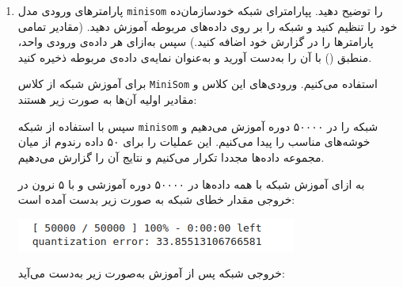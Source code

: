 \begin{enumerate}
\begin{qsolve}
	 	
	\end{qsolve}
	 	
	 	
	 	
	 	
	 	\item پارامتر‌های ورودی مدل \texttt{minisom} را توضیح دهید. پپارامترای شبکه خودسازمان‌ده خود را تنظیم کنید و شبکه را بر روی داده‌های مربوطه آموزش دهید. (مقادیر تمامی پارامتر‌ها را در گزارش خود اضافه کنید.) سپس به‌ازای هر داده‌ی ورودی واحد، منطبق () با آن را به‌دست آورید و به‌عنوان نمایه‌ی داده‌ی مربوطه ذخیره کنید.
	 	
	 	
	 \begin{qsolve}
	 	برای آموزش شبکه از کلاس \texttt{MiniSom} استفاده می‌کنیم. ورودی‌های این کلاس و مقادیر اولیه آن‌ها به صورت زیر هستند:
	 	
	 	
	 \end{qsolve}
	 	
	 	
	 	
	 	
	 	
	 	
	 	
	 	
	 	
	 \begin{qsolve}
	 	
	 	سپس با استفاده از شبکه \texttt{minisom} شبکه را در ۵۰۰۰۰ دوره آموزش می‌دهیم و خوشه‌های مناسب را پیدا می‌کنیم. این عملیات را برای ۵۰ داده رندوم از میان مجموعه داده‌ها مجددا تکرار می‌کنیم و نتایج آن را گزارش می‌دهیم.
	 	
	 	
	 	به ازای آموزش شبکه با همه داده‌ها در ۵۰۰۰۰ دوره آموزشی و با ۵ نرون در خروجی مقدار خطای شبکه به صورت زیر بدست آمده است:
	 	
	 	\begin{center}
	 		\includegraphics*[width=0.7\linewidth]{pics/img17.png}
	 		\label{خطای شبکه}
	 	\end{center}
	 	
	 	خروجی شبکه پس از آموزش به‌صورت زیر به‌دست می‌آید:
	 
	
	\end{qsolve}
	
	
	
	
	
	\begin{qsolve}
		

\end{qsolve}
\end{enumerate}
